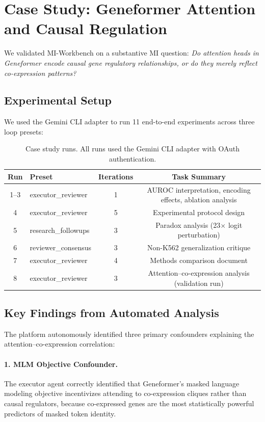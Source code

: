 \documentclass[11pt,a4paper]{article}
\begin{document}

\section{Case Study: Geneformer Attention and Causal Regulation}
\label{sec:casestudy}

We validated MI-Workbench on a substantive MI question: \emph{Do attention heads in Geneformer encode causal gene regulatory relationships, or do they merely reflect co-expression patterns?}

\subsection{Experimental Setup}
We used the Gemini CLI adapter to run 11 end-to-end experiments across three loop presets:

\begin{table}[h]
\centering
\small
\caption{Case study runs. All runs used the Gemini CLI adapter with OAuth authentication.}
\label{tab:runs}
\begin{tabular}{@{}clcc@{}}
\toprule
\textbf{Run} & \textbf{Preset} & \textbf{Iterations} & \textbf{Task Summary} \\
\midrule
1--3 & executor\_reviewer & 1 & AUROC interpretation, encoding effects, ablation analysis \\
4 & executor\_reviewer & 5 & Experimental protocol design \\
5 & research\_followups & 3 & Paradox analysis (23$\times$ logit perturbation) \\
6 & reviewer\_consensus & 3 & Non-K562 generalization critique \\
7 & executor\_reviewer & 4 & Methods comparison document \\
8 & executor\_reviewer & 3 & Attention--co-expression analysis (validation run) \\
\bottomrule
\end{tabular}
\end{table}

\subsection{Key Findings from Automated Analysis}

The platform autonomously identified three primary confounders explaining the attention--co-expression correlation:

\paragraph{1. MLM Objective Confounder.}
The executor agent correctly identified that Geneformer's masked language modeling objective incentivizes attending to co-expression cliques rather than causal regulators, because co-expressed genes are the most statistically powerful predictors of masked token identity.
\end{document}
